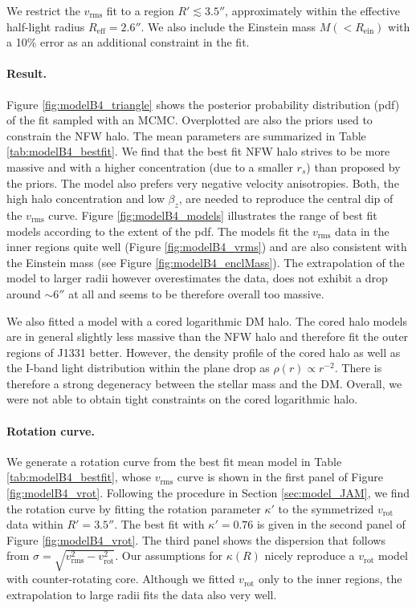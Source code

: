 We restrict the $v_\text{rms}$ fit to a region $R' \lesssim 3.5''$, approximately within the effective half-light radius $R_\text{eff} = 2.6''$. We also include the Einstein mass $M(<R_\text{ein})$ with a 10\% error as an additional constraint in the fit.

\paragraph{Result.} Figure \ref{fig:modelB4_triangle} shows the posterior probability distribution (pdf) of the fit sampled with an MCMC. Overplotted are also the priors used to constrain the NFW halo. The mean parameters are summarized in Table \ref{tab:modelB4_bestfit}. We find that the best fit NFW halo strives to be more massive and with a higher concentration (due to a smaller $r_s$) than  proposed by the priors. The model also prefers  very negative velocity anisotropies. Both, the high halo concentration and low $\beta_z$, are needed to reproduce the central dip of the $v_\text{rms}$ curve. Figure \ref{fig:modelB4_models} illustrates the range of best fit models according to the extent of the pdf. The models fit the $v_\text{rms}$ data in the inner regions quite well (Figure \ref{fig:modelB4_vrms}) and are also consistent with the Einstein mass (see Figure \ref{fig:modelB4_enclMass}). The extrapolation of the model to larger radii however overestimates the data, does not exhibit a drop around $\sim 6''$ at all and seems to be therefore overall too massive.

We also fitted a model with a cored logarithmic DM halo. The cored halo models are in general slightly less massive than the NFW halo and therefore fit the outer regions of J1331 better. However, the density profile of the cored halo as well as the I-band light distribution within the plane drop as $\rho(r) \propto r^{-2}$. There is therefore a strong degeneracy between the stellar mass and the DM. Overall, we were not able to obtain tight constraints on the cored logarithmic halo.

\paragraph{Rotation curve.} We generate a rotation curve from the best fit mean model in Table \ref{tab:modelB4_bestfit}, whose $v_\text{rms}$ curve is shown in the first panel of Figure \ref{fig:modelB4_vrot}. Following the procedure in Section \ref{sec:model_JAM}, we find the rotation curve by fitting the rotation parameter $\kappa'$ to the symmetrized $v_\text{rot}$ data within $R' = 3.5''$. The best fit with $\kappa' = 0.76$ is given in the second panel of Figure \ref{fig:modelB4_vrot}. The third panel shows the dispersion that follows from $\sigma = \sqrt{v_\text{rms}^2 - v_\text{rot}^2}$. Our assumptions for $\kappa(R)$ nicely reproduce a $v_\text{rot}$ model with counter-rotating core. Although we fitted $v_\text{rot}$ only to the inner regions, the extrapolation to large radii fits the data also very well.


